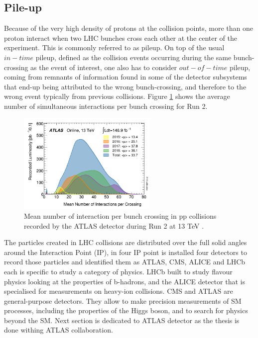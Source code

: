 \subsection{Pile-up}
\label{chap2:LHC:PU}
Because of the very high density of protons at the collision points, more than one proton interact when two LHC bunches cross each other at the center of the experiment. This is commonly referred to as pileup. On top of the usual $in-time$ pileup, defined as the collision events occurring during the same bunch-crossing as the event of interest, one also has to consider $out-of-time$ pileup, coming from remnants of information found in some of the detector subsystems that end-up being attributed to the wrong bunch-crossing, and therefore to the wrong event typically from previous collisions. Figure \ref{fig:chap2:LHC:PU} shows the average number of simultaneous interactions per bunch crossing for Run 2. \\
\begin{figure}[H]
    \centering
    \includegraphics[width=0.6\textwidth]{Ch2/Img/PU.png}
    \caption{Mean number of interaction per bunch crossing in pp collisions recorded by the ATLAS detector during Run 2 at 13 TeV \cite{Lumi2018}.}
    \label{fig:chap2:LHC:PU}
\end{figure}
The particles created in LHC collisions are distributed over the full solid angles around the Interaction Point (IP), in four IP point is installed four detectors to record those particles and identified them as ATLAS, CMS, ALICE and LHCb each is specific to study a category of physics. LHCb built to study flavour physics looking at the properties of b-hadrons, and the ALICE detector that is specialised for measurements on heavy-ion collisions. CMS and ATLAS are general-purpose detectors. They allow to make precision measurements of SM processes, including the properties of the Higgs boson, and to search for physics beyond the SM. Next section is dedicated to ATLAS detector as the thesis is done withing ATLAS collaboration.

